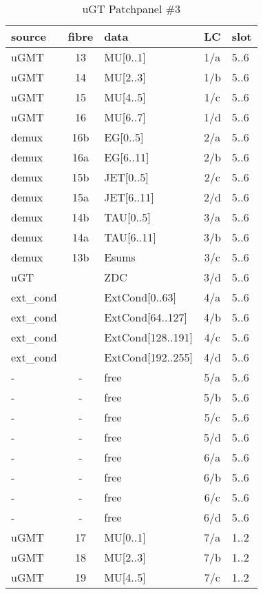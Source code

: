 \begin{longtable}{|l|c|l|c|l|}
\caption{uGT Patchpanel \#3}
    \label{tab:app:ugt_opt_pp_2}\\
\hline
\textbf{source}& \textbf{fibre}& \textbf{data}& \textbf{LC}& \textbf{slot}\\
\hline
\hline
\endhead
uGMT  & 13  & MU[0..1]   & 1/a  & 5..6 \\\hline
uGMT  & 14  & MU[2..3]   & 1/b  & 5..6 \\\hline
uGMT  & 15  & MU[4..5]   & 1/c  & 5..6 \\\hline
uGMT  & 16  & MU[6..7]   & 1/d  & 5..6 \\\hline
demux & 16b & EG[0..5]   & 2/a  & 5..6 \\\hline
demux & 16a & EG[6..11]  & 2/b  & 5..6 \\\hline
demux & 15b & JET[0..5]  & 2/c  & 5..6 \\\hline
demux & 15a & JET[6..11] & 2/d  & 5..6 \\\hline
demux & 14b & TAU[0..5]  & 3/a  & 5..6 \\\hline
demux & 14a & TAU[6..11] & 3/b  & 5..6 \\\hline
demux & 13b & Esums      & 3/c  & 5..6 \\\hline
uGT &    & ZDC      & 3/d  & 5..6 \\\hline
ext\_cond &     & ExtCond[0..63]    & 4/a  & 5..6 \\\hline
ext\_cond &     & ExtCond[64..127]  & 4/b  & 5..6 \\\hline
ext\_cond &     & ExtCond[128..191] & 4/c  & 5..6 \\\hline
ext\_cond &     & ExtCond[192..255] & 4/d  & 5..6 \\\hline
- & - & free & 5/a  & 5..6 \\\hline
- & - & free & 5/b  & 5..6 \\\hline
- & - & free & 5/c  & 5..6 \\\hline
- & - & free & 5/d  & 5..6 \\\hline
- & - & free & 6/a  & 5..6 \\\hline
- & - & free & 6/b  & 5..6 \\\hline
- & - & free & 6/c  & 5..6 \\\hline
- & - & free & 6/d  & 5..6 \\\hline
\hline
uGMT  & 17  & MU[0..1]   & 7/a  & 1..2 \\\hline
uGMT  & 18  & MU[2..3]   & 7/b  & 1..2 \\\hline
uGMT  & 19  & MU[4..5]   & 7/c  & 1..2 \\\hline

\end{longtable}
